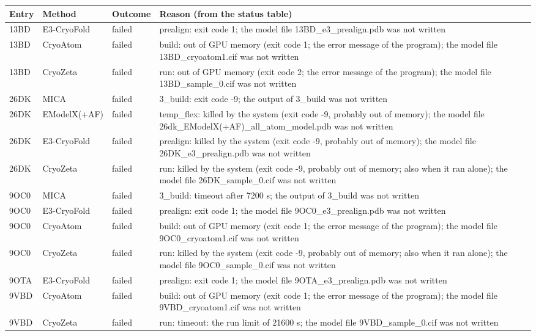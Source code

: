 \begin{tabular}{@{}lllp{9.4cm}@{}}
\toprule
Entry & Method & Outcome & Reason (from the status table) \\
\midrule
13BD & E3-CryoFold & failed & prealign: exit code 1; the model file 13BD\_e3\_prealign.pdb was not written \\
13BD & CryoAtom & failed & build: out of GPU memory (exit code 1; the error message of the program); the model file 13BD\_cryoatom1.cif was not written \\
13BD & CryoZeta & failed & run: out of GPU memory (exit code 2; the error message of the program); the model file 13BD\_sample\_0.cif was not written \\
26DK & MICA & failed & 3\_build: exit code -9; the output of 3\_build was not written \\
26DK & EModelX(+AF) & failed & temp\_flex: killed by the system (exit code -9, probably out of memory); the model file 26dk\_EModelX(+AF)\_all\_atom\_model.pdb was not written \\
26DK & E3-CryoFold & failed & prealign: killed by the system (exit code -9, probably out of memory); the model file 26DK\_e3\_prealign.pdb was not written \\
26DK & CryoZeta & failed & run: killed by the system (exit code -9, probably out of memory; also when it ran alone); the model file 26DK\_sample\_0.cif was not written \\
9OC0 & MICA & failed & 3\_build: timeout after 7200 s; the output of 3\_build was not written \\
9OC0 & E3-CryoFold & failed & prealign: exit code 1; the model file 9OC0\_e3\_prealign.pdb was not written \\
9OC0 & CryoAtom & failed & build: out of GPU memory (exit code 1; the error message of the program); the model file 9OC0\_cryoatom1.cif was not written \\
9OC0 & CryoZeta & failed & run: killed by the system (exit code -9, probably out of memory; also when it ran alone); the model file 9OC0\_sample\_0.cif was not written \\
9OTA & E3-CryoFold & failed & prealign: exit code 1; the model file 9OTA\_e3\_prealign.pdb was not written \\
9VBD & CryoAtom & failed & build: out of GPU memory (exit code 1; the error message of the program); the model file 9VBD\_cryoatom1.cif was not written \\
9VBD & CryoZeta & failed & run: timeout: the run limit of 21600 s; the model file 9VBD\_sample\_0.cif was not written \\

\end{tabular}
